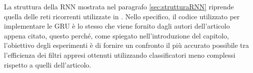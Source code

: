 \documentclass[../../main.tex]{subfiles}
\begin{document}
    La struttura della RNN mostrata nel paragrafo \ref{sec:strutturaRNN} riprende quella delle reti ricorrenti utilizzate in \cite{ma2020}. Nello specifico, il codice utilizzato per implementare le GRU è lo stesso che viene fornito dagli autori dell'articolo appena citato, questo perché, come spiegato nell'introduzione del capitolo, l'obiettivo degli esperimenti è di fornire un confronto il più accurato possibile tra l'efficienza dei  filtri appresi ottenuti utilizzando classificatori meno complessi rispetto a quelli dell'articolo. 
\end{document}
